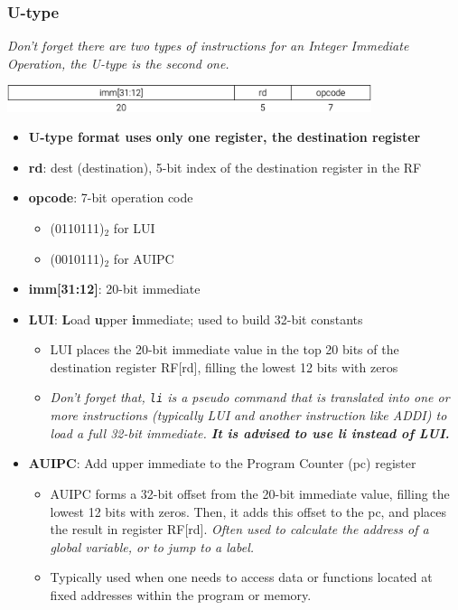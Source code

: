 \documentclass[12pt,openany]{book}
\begin{document}
\subsubsection{U-type}
\textit{Don't forget there are two types of instructions for an Integer Immediate Operation, the U-type is the second one.}
\begin{center}
	\includegraphics[width=0.8\textwidth]{circuits/20.1.2_6.png}
\end{center}

\begin{itemize}
	\setlength\itemsep{-2px}
    \item \textbf{U-type format uses only one register, the destination register}
	\item \textbf{rd}: dest (destination), 5-bit index of the destination register in the RF
	\item \textbf{opcode}: 7-bit operation code
	\begin{itemize}
		\setlength\itemsep{-2px}
		\item (0110111)$_2$ for LUI
		\item (0010111)$_2$ for AUIPC
	\end{itemize}
	\item \textbf{imm[31:12]}: 20-bit immediate
\end{itemize}

\begin{itemize}	
	\setlength\itemsep{-2px}
    \item \textbf{LUI}: \textbf{L}oad \textbf{u}pper \textbf{i}mmediate; used to build 32-bit constants
    \begin{itemize}
		\setlength\itemsep{-2px}
        \item LUI places the 20-bit immediate value in the top 20 bits of the destination register RF[rd], filling the lowest 12 bits with zeros
        \item \textit{Don't forget that, \texttt{li} is a pseudo command that is translated into one or more instructions (typically LUI and another instruction like ADDI) to load a full 32-bit immediate. \textbf{It is advised to use li instead of LUI.}}
    \end{itemize}
    \item \textbf{AUIPC}: Add upper immediate to the Program Counter (pc) register
    \begin{itemize}
		\setlength\itemsep{-2px}
        \item AUIPC forms a 32-bit offset from the 20-bit immediate value, filling the lowest 12 bits with zeros. Then, it adds this offset to the pc, and places the result in register RF[rd]. \textit{Often used to calculate the address of a global variable, or to jump to a label.}
        \item Typically used when one needs to access data or functions located at fixed addresses within the program or memory.
    \end{itemize}
\end{itemize}
\end{document}
